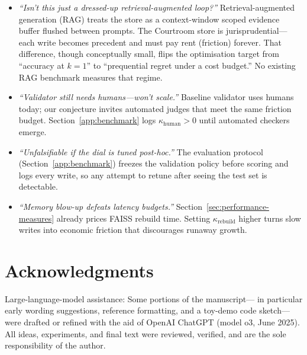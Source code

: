\documentclass[11pt]{article}
\begin{document}
\begin{itemize}
\item \emph{“Isn't this just a dressed-up retrieval-augmented loop?”} Retrieval-augmented generation (RAG) treats the store as a context-window scoped evidence buffer flushed between prompts. The Courtroom store is jurisprudential—each write becomes precedent and must pay rent (friction) forever. That difference, though conceptually small, flips the optimisation target from “accuracy at \(k = 1\)” to “prequential regret under a cost budget.” No existing RAG benchmark measures that regime.

\item \emph{“Validator still needs humans—won't scale.”}  Baseline validator uses humans today; our conjecture invites automated judges that meet the same friction budget. Section~\ref{app:benchmark} logs $\kappa_{\text{human}}>0$ until automated checkers emerge.

\item \emph{“Unfalsifiable if the dial is tuned post-hoc.”}
      The evaluation protocol (Section~\ref{app:benchmark}) freezes the validation policy
      before scoring and logs every write, so any attempt to
      retune after seeing the test set is detectable.

\item \emph{“Memory blow-up defeats latency budgets.”}  Section~\ref{sec:performance-measures} already prices FAISS rebuild time.  Setting $\kappa_{\text{rebuild}}$ higher turns slow writes into economic friction that discourages runaway growth.
\end{itemize}

\section*{Acknowledgments}

Large-language-model assistance: Some portions of the manuscript—
in particular early wording suggestions, reference formatting, and a toy-demo
code sketch—were drafted or refined with the aid of OpenAI ChatGPT
(model o3, June 2025). All ideas, experiments, and final text were reviewed,
verified, and are the sole responsibility of the author.

\printbibliography
\end{document}
